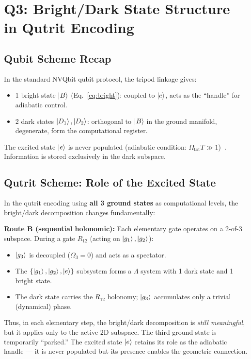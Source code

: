 \documentclass[11pt,letterpaper]{article}
\begin{document}
\section{Q3: Bright/Dark State Structure in Qutrit Encoding}
\label{sec:Q3}

\subsection{Qubit Scheme Recap}

In the standard NVQbit qubit protocol, the tripod linkage gives:
\begin{itemize}
  \item 1 bright state $\ket{B}$ (Eq.~\ref{eq:bright}): coupled to $\ket{e}$, acts as the
    ``handle'' for adiabatic control.
  \item 2 dark states $\ket{D_1}, \ket{D_2}$: orthogonal to $\ket{B}$ in the ground
    manifold, degenerate, form the computational register.
\end{itemize}
The excited state $\ket{e}$ is never populated (adiabatic condition: $\Omega_{\text{tot}}
T \gg 1$)~\cite{Unanyan2004}. Information is stored exclusively in the dark subspace.

\subsection{Qutrit Scheme: Role of the Excited State}

In the qutrit encoding using \textbf{all 3 ground states} as computational levels, the
bright/dark decomposition changes fundamentally:

\textbf{Route B (sequential holonomic):} Each elementary gate operates on a 2-of-3
subspace. During a gate $R_{12}$ (acting on $\ket{g_1}, \ket{g_2}$):
\begin{itemize}
  \item $\ket{g_3}$ is decoupled ($\Omega_3 = 0$) and acts as a spectator.
  \item The $\{\ket{g_1}, \ket{g_2}, \ket{e}\}$ subsystem forms a $\Lambda$ system with
    1 dark state and 1 bright state.
  \item The dark state carries the $R_{12}$ holonomy; $\ket{g_3}$ accumulates only a
    trivial (dynamical) phase.
\end{itemize}
Thus, in each elementary step, the bright/dark decomposition is \emph{still meaningful},
but it applies only to the active 2D subspace. The third ground state is temporarily
``parked.'' The excited state $\ket{e}$ retains its role as the adiabatic handle ---
it is never populated but its presence enables the geometric connection.
\end{document}
